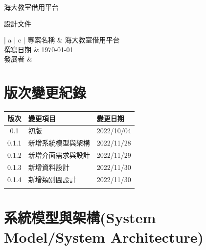 \documentclass{article}
\begin{document}
\begin{titlepage}
	\centering

	{\huge 海大教室借用平台}

	\vfill

	{\huge 設計文件}

	\vfill

	\begin{Large}
		\begin{center}
			\begin{tabular}{| a | c |}
				\hline
				專案名稱 & 海大教室借用平台               \\ \hline
				撰寫日期 & \today                 \\ \hline
				發展者  &  \\ \hline
			\end{tabular}
		\end{center}
	\end{Large}
\end{titlepage}


\section*{版次變更紀錄}

\begin{tabularx}{\textwidth}{| c | X | X |}
	\rowcolor{LightGray}
	\hline
	版次    & 變更項目      & 變更日期       \\ \hline
	0.1   & 初版        & 2022/10/04 \\ \hline
	0.1.1 & 新增系統模型與架構 & 2022/11/28 \\ \hline
	0.1.2 & 新增介面需求與設計 & 2022/11/29 \\ \hline
	0.1.3 & 新增資料設計    & 2022/11/30 \\ \hline
	0.1.4 & 新增類別圖設計   & 2022/11/30 \\ \hline
	      &           &            \\ \hline
\end{tabularx}

\newpage

\begin{center}
	\tableofcontents
\end{center}

\newpage

\section[系統模型與架構(SYSTEM MODEL/SYSTEM ARCHITECTURE)]{系統模型與架構(System Model/System Architecture)}
\end{document}
